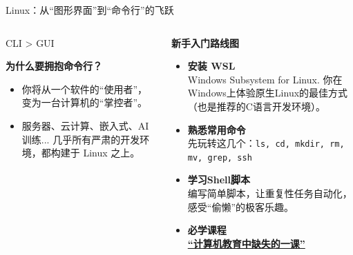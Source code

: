 \documentclass{beamer}
\newcommand{\hrefcol}[2]{\textcolor{cyan}{\href{#1}{#2}}}
\begin{document}
\begin{frame}{Linux：从“图形界面”到“命令行”的飞跃}
    \begin{columns}[T]
        \begin{column}{0.5\textwidth}
            \begin{center}
                \Huge CLI > GUI
                \vspace{0.5cm}
                
                \Large \textbf{为什么要拥抱命令行？}
            \end{center}
            
            \begin{itemize}
                \item  你将从一个软件的“使用者”，变为一台计算机的\alert{“掌控者”}。
               
                \item  服务器、云计算、嵌入式、AI训练... 几乎所有严肃的开发环境，都构建于 \alert{Linux} 之上。
            \end{itemize}

        \end{column}
        
        \begin{column}{0.5\textwidth}
            \Large\textbf{新手入门路线图}
            \vspace{0.3cm}
            
            \begin{itemize}
                \item \textbf{安装 WSL} \\
                \small Windows Subsystem for Linux. 你在Windows上体验原生Linux的最佳方式（也是推荐的C语言开发环境）。
                
                \item \textbf{熟悉常用命令} \\
                \small 先玩转这几个：\texttt{ls, cd, mkdir, rm, mv, grep, ssh}
                
                \item \textbf{学习Shell脚本} \\
                \small 编写简单脚本，让重复性任务自动化，感受“偷懒”的极客乐趣。

                \item \textbf{必学课程} \\
                \small \hrefcol{https://missing.csail.mit.edu/2020/}{\textbf{“计算机教育中缺失的一课”}}
            \end{itemize}
        \end{column}
    \end{columns}

\end{frame}
\end{document}
